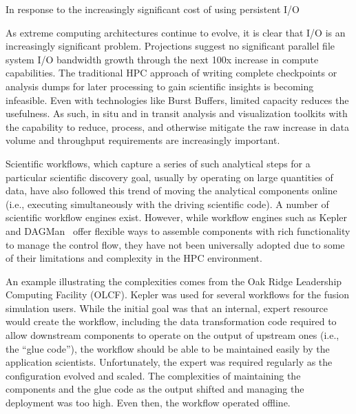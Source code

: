 In response to the increasingly significant cost of using
persistent I/O 

As extreme computing architectures continue to evolve, it is 
clear that I/O is an increasingly significant problem.  Projections suggest no
significant parallel file system I/O bandwidth growth through the next 100x
increase in compute capabilities.  The traditional HPC approach of writing
complete checkpoints or analysis dumps for later processing to gain scientific
insights is becoming infeasible.  Even with technologies like Burst Buffers,
limited capacity reduces the usefulness. As such, in situ and in transit
analysis and visualization toolkits with the capability to reduce, process, and
otherwise mitigate the raw increase in data volume and throughput requirements
are increasingly important.


Scientific workflows, which 
capture a series of such analytical steps for a
particular scientific discovery goal, usually
by operating on large quantities of data,
have also followed this trend of moving the analytical components
online (i.e., executing simultaneously with the driving scientific code).
A number of scientific workflow engines exist.
However, while workflow engines such as
Kepler~\cite{bertram:2006:kepler} and
DAGMan~\cite{Malewicz:2006:dagman}
offer flexible ways to assemble components
with rich functionality to manage the control flow, they have not been
universally adopted due to some of their limitations and complexity in the
HPC environment.

An example illustrating the complexities comes from the Oak Ridge
Leadership Computing Facility (OLCF).  Kepler was used for several workflows
for the fusion simulation users.  While the initial goal was that an internal,
expert resource would create the workflow,
including the data transformation code required
to allow downstream components to operate on the output of
upstream ones (i.e., the ``glue code''),
the workflow should be able to be maintained
easily by the application scientists. Unfortunately,
the expert was required regularly as the configuration evolved and scaled.
The complexities of maintaining the components and the glue code as the output
shifted and managing the deployment was too high.
Even then, the workflow operated offline.

